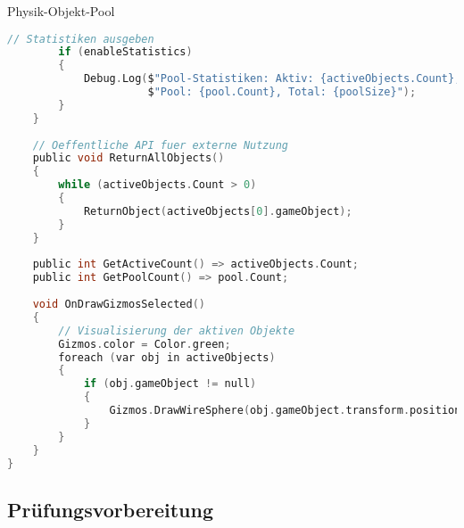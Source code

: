 \begin{code}{Physik-Objekt-Pool}
\begin{lstlisting}[language=C, style=basesmol]
        // Statistiken ausgeben
        if (enableStatistics) 
        {
            Debug.Log($"Pool-Statistiken: Aktiv: {activeObjects.Count}, " +
                      $"Pool: {pool.Count}, Total: {poolSize}");
        }
    }
    
    // Oeffentliche API fuer externe Nutzung
    public void ReturnAllObjects() 
    {
        while (activeObjects.Count > 0) 
        {
            ReturnObject(activeObjects[0].gameObject);
        }
    }
    
    public int GetActiveCount() => activeObjects.Count;
    public int GetPoolCount() => pool.Count;
    
    void OnDrawGizmosSelected() 
    {
        // Visualisierung der aktiven Objekte
        Gizmos.color = Color.green;
        foreach (var obj in activeObjects) 
        {
            if (obj.gameObject != null) 
            {
                Gizmos.DrawWireSphere(obj.gameObject.transform.position, 0.5f);
            }
        }
    }
}
\end{lstlisting}
\end{code}

\subsection{Prüfungsvorbereitung}

